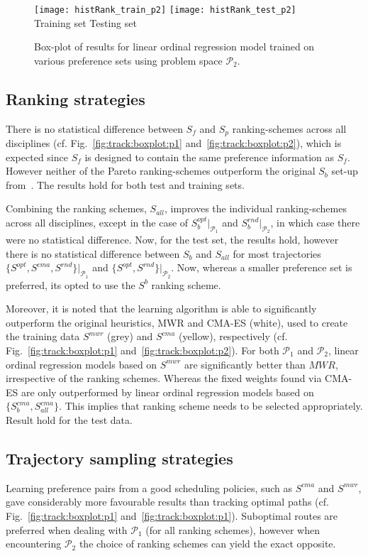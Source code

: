 \documentclass[smallextended]{llncs}
\begin{document}
\begin{figure}\flushright \hfill
\texttt{[image: histRank\_train\_p2]} \hfill
\texttt{[image: histRank\_test\_p2]} \\
\hfill {Training set }\hfill {Testing set}
\caption{Box-plot of results for linear ordinal regression model trained on various preference sets using problem space $\mathcal{P}_2$. }
\label{fig:rank:boxplot:p2}
\end{figure}

\subsection{Ranking strategies}
There is no statistical difference between $S_f$ and $S_p$ ranking-schemes across all disciplines (cf. 
Fig.~\ref{fig:track:boxplot:p1} and~\ref{fig:track:boxplot:p2}), which is expected since $S_f$ is designed to contain 
the same preference information as $S_f$. However neither of the Pareto ranking-schemes outperform the original $S_b$ 
set-up from~\cite{InRu11a}. The results hold for both test and training sets. 

Combining the ranking schemes, $S_{all}$, improves the individual ranking-schemes across all disciplines, except in the case of $S_b^{opt}\big|_{\mathcal{P}_1}$ and $S_b^{rnd}\big|_{\mathcal{P}_2}$, in which case there were no statistical difference. Now, for the test set, the results hold, however there is no statistical difference between $S_b$ and $S_{all}$ for most trajectories $\{S^{opt},S^{cma},S^{rnd}\}\big|_{\mathcal{P}_1}$ and  $\{S^{opt},S^{rnd}\}\big|_{\mathcal{P}_2}$. Now, whereas a smaller preference set is preferred, its opted to use the $S^{b}$ ranking scheme. 

Moreover, it is noted that the learning algorithm is able to significantly outperform the original heuristics, MWR and CMA-ES (white), used to create the training data $S^{mwr}$ (grey) and $S^{cma}$ (yellow), respectively (cf. Fig.~\ref{fig:track:boxplot:p1} and~\ref{fig:track:boxplot:p2}). For both $\mathcal{P}_1$ and $\mathcal{P}_2$, linear ordinal regression models based on $S^{mwr}$ are significantly better than $MWR$, irrespective of the ranking schemes. Whereas the fixed weights found via CMA-ES are only outperformed by linear ordinal regression models based on $\{S_b^{cma},S_{all}^{cma}\}$. This implies that ranking scheme needs to be selected appropriately. Result hold for the test data.

\subsection{Trajectory sampling strategies}
Learning preference pairs from a good scheduling policies, such as $S^{cma}$ and $S^{mwr}$, gave considerably more favourable results than tracking optimal paths (cf. Fig.~\ref{fig:track:boxplot:p1} and~\ref{fig:track:boxplot:p1}). Suboptimal routes are preferred when dealing with $\mathcal{P}_1$ (for all ranking schemes), however when encountering $\mathcal{P}_2$ the choice of ranking schemes can yield the exact opposite.
\end{document}
